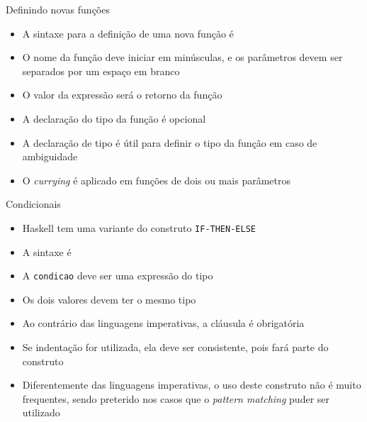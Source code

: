 \begin{frame}[fragile]{Definindo novas funções}

    \begin{itemize}
        \item A sintaxe para a definição de uma nova função é


        \item O nome da função deve iniciar em minúsculas, e os parâmetros devem ser separados
            por um espaço em branco

        \item O valor da expressão será o retorno da função

        \item A declaração do tipo da função é opcional


        \item A declaração de tipo é útil para definir o tipo da função em caso de ambiguidade

        \item O \textit{currying} é aplicado em funções de dois ou mais parâmetros 

    \end{itemize}

\end{frame}

\begin{frame}[fragile]{Condicionais}

    \begin{itemize}
        \item Haskell tem uma variante do construto \texttt{IF-THEN-ELSE}

        \item A sintaxe é 


        \item A \texttt{condicao} deve ser uma expressão do tipo 

        \item Os dois valores devem ter o mesmo tipo

        \item Ao contrário das linguagens imperativas, a cláusula  é 
            obrigatória

        \item Se indentação for utilizada, ela deve ser consistente, pois fará parte
            do construto

        \item Diferentemente das linguagens imperativas, o uso deste construto não é muito
            frequentes, sendo preterido nos casos que o \textit{pattern matching} puder ser
            utilizado
    \end{itemize}

\end{frame}

